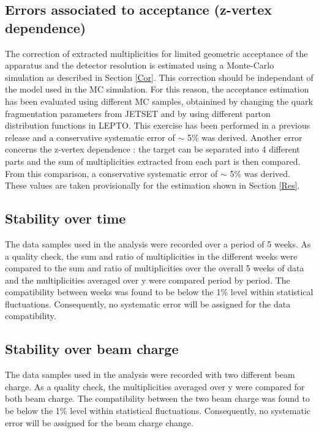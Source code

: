 \documentclass[letterpaper,12pt]{article}
\begin{document}
\subsection{Errors associated to acceptance (z-vertex dependence)}

The correction of extracted multiplicities for limited geometric acceptance of the apparatus and the detector resolution is estimated using a Monte-Carlo simulation as described in Section \ref{Cor}. This correction should be independant of the model used in the MC simulation. For this reason, the acceptance estimation has been evaluated using different MC samples, obtainined by changing the quark fragmentation parameters from JETSET and by using different parton distribution functions in LEPTO. This exercise has been performed in a previous release \cite{Release2015} and a conservative systematic error of $\sim$ 5\% was derived.
Another error concerns the z-vertex dependence : the target can be separated into 4 different parts and the sum of multiplicities extracted from each part is then compared. From this comparison, a conservative systematic error of $\sim$ 5\% was derived.
These values are taken provisionally for the estimation shown in Section \ref{Res}.

\subsection{Stability over time}

The data samples used in the analysis were recorded over a period of 5 weeks. As a quality check, the sum and ratio of multiplicities in the different weeks were compared to the sum and ratio of multiplicities over the overall 5 weeks of data and the multiplicities averaged over y were compared period by period. The compatibility between weeks was found to be below the 1\% level within statistical fluctuations. Consequently, no systematic error will be assigned for the data compatibility.

\subsection{Stability over beam charge}

The data samples used in the analysis were recorded with two different beam charge. As a quality check, the multiplicities averaged over y were compared for both beam charge. The compatibility between the two beam charge was found to be below the 1\% level within statistical fluctuations. Consequently, no systematic error will be assigned for the beam charge change.
\end{document}
